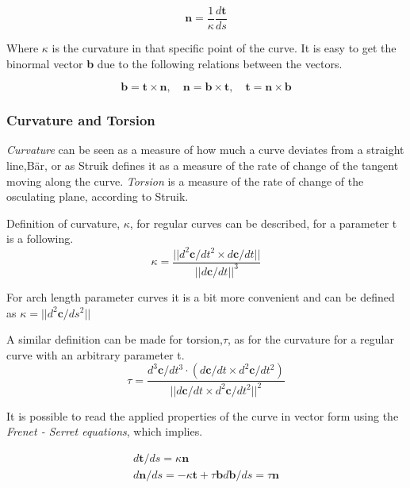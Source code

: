 \begin{equation}
\textbf{n} = \frac{1}{\kappa}\frac{d\textbf{t}}{ds} 
\end{equation}

Where $\kappa$ is the curvature in that specific point of the curve. It is easy to get the binormal vector \textbf{b} due to the following relations between the vectors.

\begin{equation}
\textbf{b} = \textbf{t} \times \textbf{n} ,\quad \textbf{n} = \textbf{b} \times \textbf{t} ,\quad \textbf{t} = \textbf{n} \times \textbf{b} 
\end{equation}

\subsubsection{Curvature and Torsion} \label{curvature}

\textit{Curvature} can be seen as a measure of how much a curve deviates from a straight line,Bär, or as Struik defines it as a measure of the rate of change of the tangent moving along the curve. \textit{Torsion} is a measure of the rate of change of the osculating plane, according to Struik.

\vspace{5mm} %

Definition of curvature, $\kappa$, for regular curves can be described, for a parameter t is a following. 
\begin{equation}
\kappa = \frac{|| d^2\textbf{c}/ dt^2 \times d\textbf{c}/dt ||}{||d\textbf{c}/dt||^3} 
\end{equation}

For arch length parameter curves it is a bit more convenient and can be defined as $\kappa = ||d^2 \textbf{c}/ ds^2||$

A similar definition can be made for torsion,$\tau$, as for the curvature for a regular curve with an arbitrary parameter t. 
\begin{equation}
\tau = \frac{ d^3\textbf{c}/ dt^3 \cdot(d\textbf{c}/dt \times d^2\textbf{c}/dt^2)}{||d\textbf{c}/dt \times d^2\textbf{c}/dt^2||^2} 
\end{equation}

It is possible to read the applied properties of the curve in vector form using the \textit{Frenet - Serret equations}, which implies.


\begin{align}
d\textbf{t}/ds = \kappa \textbf{n} \\
d\textbf{n}/ds = - \kappa \textbf{t} + \tau \textbf{b}
d\textbf{b}/ds = \tau \textbf{n}
\end{align}


